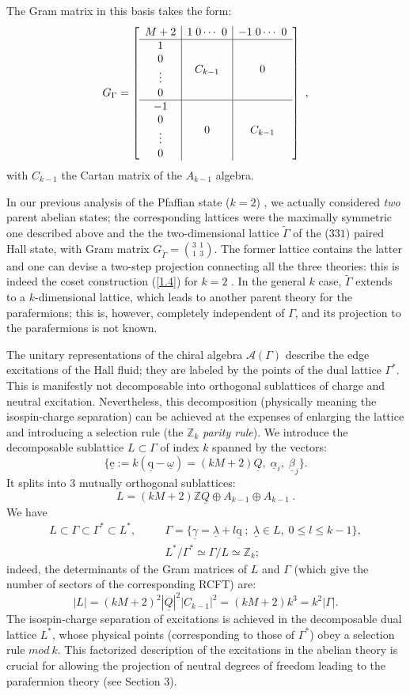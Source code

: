 \documentclass[a4paper,12pt]{article}
\newcommand{\beq}{\begin{equation}}
\newcommand{\eeq}{\end{equation}}
\newcommand{\beqa}{\begin{eqnarray}}
\newcommand{\eeqa}{\end{eqnarray}}
\newcommand{\nn}{\nonumber \\}
\def \a {\underline{\alpha}}
\def \l {\underline{\lambda}}
\def \e {\underline{\mathrm{e}}}
\def \Q {\underline{Q}}
\def \q {\underline{\mathrm{q}}}
\def \b {\underline{\beta}}
\def \A {{\mathcal A} }
\def \g {\underline{\gamma}}
\def \o {\underline{\omega}}
\def \Z {{\mathbb Z}}
\def \G   {\Gamma}
\begin{document}
The Gram matrix in this basis takes the form:
\beq
G_\G =\left[
\begin{array}{c|c|c}
M+2 &  1 \; 0  \cdots  \ 0 & -1 \;  0  \cdots \ 0\cr \hline
\begin{array}{c}
1 \cr 0 \cr \vdots \cr 0
\end{array} &  C_{k-1} & 0 \cr \hline
\begin{array}{c}
- 1\cr 0 \cr \vdots \cr 0
\end{array} &  0 & C_{k-1}
\end{array} \right]\ ,
\eeq
with $C_{k-1}$ the Cartan matrix of the $A_{k-1}$ algebra.

In our previous analysis of the Pfaffian state ($k=2$) \cite{cgt},
we actually considered {\it two} parent abelian
states; the corresponding lattices were the maximally symmetric one
described above and the
the two-dimensional lattice $\tilde{\G}$ of the ($331$) paired
Hall state, with Gram matrix $G_{\tilde{\G}}={3 \ \ 1\choose 1\ \ 3}$.
The former lattice contains the latter and one can devise a two-step
projection connecting all the three theories:
this is indeed the coset construction (\ref{1.4}) for $k=2$ \cite{cgt2}.
In the general $k$ case, $\tilde{\G}$ extends to 
a $k$-dimensional lattice, which leads to another parent theory for the
parafermions; this is, however, completely independent of $\G$,
and its projection to the parafermions is not known. 

The unitary representations of the chiral algebra $\A(\G)$ 
describe the edge excitations of the Hall fluid;
they are labeled by the points of the dual lattice
$\G^*$. This is manifestly not decomposable into orthogonal
sublattices of charge and neutral excitation.
Nevertheless, this decomposition (physically meaning the isospin-charge
separation) can be achieved at the expenses of enlarging the lattice
and introducing a selection rule (the $\Z_k$ {\it parity rule}).
We introduce the decomposable sublattice 
$L\subset \G$ of index $k$ spanned by the vectors:
\beq\label{Lbasis}
\{ \e:= k(\q-\o)=(kM+2)\Q,\; \a_i,\;\b_j \}.
\eeq
It splits
into 3 mutually orthogonal sublattices:
\beq\label{1.5}
L=(kM+2)\Z\Q \oplus A_{k-1}\oplus A_{k-1} \ .
\eeq
We have
\beqa\label{1.6}
L\subset \G\subset \G^* \subset L^*, &\quad&
\G=\{ \g=\l+l\q \; ; \; \l\in L, \; 0\leq l \leq k-1 \}, \nn
&& L^*/\G^* \simeq \G/L \simeq \Z_k;
\eeqa
indeed, the determinants of the Gram matrices of $L$ and $\G$
(which give the number of sectors of the corresponding RCFT) are:
\beq\label{1.7}
|L|=(kM+2)^2 |\Q|^2 |C_{k-1}|^2=(kM+2)k^3 =k^2 |\G|.
\eeq
The isospin-charge separation of excitations is achieved
in the decomposable dual lattice $L^*$, whose physical points
(corresponding to those of $\G^*$) obey a selection rule $mod \ k$.
This factorized description of the excitations in the abelian theory
is crucial for allowing the projection of neutral degrees 
of freedom leading to the parafermion theory (see Section 3).
\end{document}
